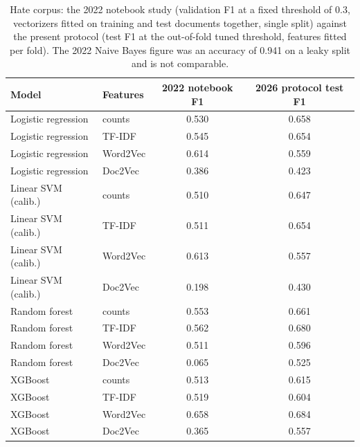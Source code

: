 \begin{table}[t]
\centering
\caption{Hate corpus: the 2022 notebook study (validation F1 at a fixed threshold of 0.3, vectorizers fitted on training and test documents together, single split) against the present protocol (test F1 at the out-of-fold tuned threshold, features fitted per fold). The 2022 Naive Bayes figure was an accuracy of 0.941 on a leaky split and is not comparable.}
\label{tab:thennow}
\small
\begin{tabular}{llcc}
\toprule
Model & Features & 2022 notebook F1 & 2026 protocol test F1 \\
\midrule
Logistic regression & counts & 0.530 & 0.658 \\
Logistic regression & TF-IDF & 0.545 & 0.654 \\
Logistic regression & Word2Vec & 0.614 & 0.559 \\
Logistic regression & Doc2Vec & 0.386 & 0.423 \\
Linear SVM (calib.) & counts & 0.510 & 0.647 \\
Linear SVM (calib.) & TF-IDF & 0.511 & 0.654 \\
Linear SVM (calib.) & Word2Vec & 0.613 & 0.557 \\
Linear SVM (calib.) & Doc2Vec & 0.198 & 0.430 \\
Random forest & counts & 0.553 & 0.661 \\
Random forest & TF-IDF & 0.562 & 0.680 \\
Random forest & Word2Vec & 0.511 & 0.596 \\
Random forest & Doc2Vec & 0.065 & 0.525 \\
XGBoost & counts & 0.513 & 0.615 \\
XGBoost & TF-IDF & 0.519 & 0.604 \\
XGBoost & Word2Vec & 0.658 & 0.684 \\
XGBoost & Doc2Vec & 0.365 & 0.557 \\
\bottomrule
\end{tabular}
\end{table}